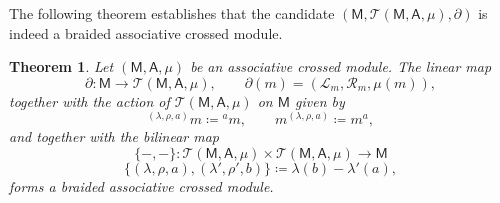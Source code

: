 \documentclass[12pt,reqno]{amsart}
\theoremstyle{plain}
\newtheorem{theorem}{Theorem}[section]
\theoremstyle{definition}
\theoremstyle{remark}
\def\lam{\lambda}
\newcommand{\A}{\ensuremath{\mathsf{A}}}
\newcommand{\MM}{\ensuremath{\mathsf{M}}}
\newcommand{\T}{\ensuremath{\mathcal{T}}}
\newcommand{\LL}{\ensuremath{\mathcal{L}}}
\newcommand{\RR}{\ensuremath{\mathcal{R}}}
\numberwithin{equation}{section}
\begin{document}
The following theorem establishes that the candidate $(\MM,\T(\MM,\A,\mu),\partial)$ is indeed a braided associative crossed module. 
\begin{theorem}\label{P:center}
	Let $(\MM,\A,\mu)$	be an  associative crossed module.	
		 The linear map
		\[
		 \partial \colon \MM \longrightarrow \T(\MM,\A,\mu),
		\qquad \partial(m) = (\LL_m,\RR_m,\mu (m)),
		\]
	together with the action of $\T(\MM,\A,\mu)$ on $\MM$ given by
		\begin{equation} \label{action_center}
			 {}^{(\lam,\rho,a)} m \coloneqq   {}^a m, \qquad m^{(\lam,\rho,a)}  \coloneqq m^a,
		\end{equation}	 
		 and together with the bilinear map
		\[
		\{-,-\}\colon
		\T(\MM,\A,\mu) \times  \T(\MM,\A,\mu) \longrightarrow \MM
		\]
			\begin{equation}\label{braiding_center}
		\{(\lam,\rho,a),(\lam',\rho',b)\}
		\coloneqq
		\lam(b) -\lam' (a),
			\end{equation}
	forms a braided  associative crossed module.
\end{theorem}
\end{document}
